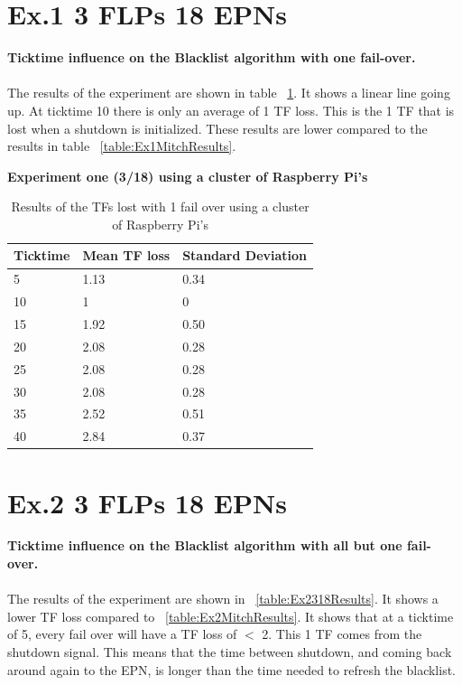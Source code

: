 \newpage

\section{Ex.1 3 FLPs 18 EPNs}
\textbf{Ticktime influence on the Blacklist algorithm with one fail-over.}
\\~\\
The results of the experiment are shown in table ~\ref{table:Ex1318Results}. It shows a linear line going up. At ticktime 10 there is only an average of 1 TF loss. This is the 1 TF that is lost when a shutdown is initialized. These results are lower compared to the results in table ~\ref{table:Ex1MitchResults}.

\begin{table}[h!]
\caption*{\textbf{Experiment one (3/18) using a cluster of Raspberry Pi's}}
\begin{tabular}{| l | l | l |}
\hline
Ticktime & Mean TF loss & Standard Deviation \\ \hline
5 & 1.13 & 0.34 \\ \hline
10 & 1 & 0 \\ \hline
15 & 1.92 & 0.50 \\ \hline
20 & 2.08 & 0.28 \\ \hline
25 & 2.08 & 0.28 \\ \hline
30 & 2.08 & 0.28 \\ \hline
35 & 2.52 & 0.51 \\ \hline
40 & 2.84 & 0.37 \\ \hline
\end{tabular}
\caption{Results of the TFs lost with 1 fail over using a cluster of Raspberry Pi's}
\label{table:Ex1318Results}
\end{table}

\newpage

\section{Ex.2 3 FLPs 18 EPNs}
\textbf{Ticktime influence on the Blacklist algorithm with all but one fail-over.}
\\~\\
The results of the experiment are shown in ~\ref{table:Ex2318Results}. It shows a lower TF loss compared to ~\ref{table:Ex2MitchResults}. It shows that at a ticktime of 5, every fail over will have a TF loss of $<$ 2. This 1 TF comes from the shutdown signal. This means that the time between shutdown, and coming back around again to the EPN, is longer than the time needed to refresh the blacklist. 

